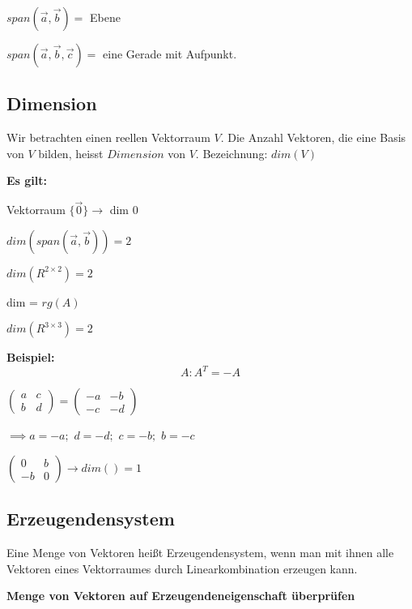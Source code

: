 \begin{multicols*}{3}
    {$span(\vec{a},\vec{b}) = $ Ebene}

    {$span(\vec{a},\vec{b},\vec{c}) = $ eine Gerade mit Aufpunkt.}


    \vfill\null
    \columnbreak
    \subsection{Dimension}
    { Wir betrachten einen reellen Vektorraum $V$.
        Die Anzahl Vektoren, die eine Basis von $V$ bilden, heisst $Dimension$ von $V$.
    }
    {Bezeichnung: $dim(V)$}

    {\textbf{Es gilt:} }
    \begin{multicols}{2}
        {Vektorraum $\{ \vec{0} \} \rightarrow $ dim $0$}

        {$dim(span(\vec{a},\vec{b})) = 2$}

        {$dim(R^{2 \times 2})=2$}
        \columnbreak

        {dim = $rg(A)$}

        {$dim(R^{3 \times 3})=2$}

    \end{multicols}
    {\textbf{Beispiel:} }
    $$A: A^T = -A$$

    $ \begin{pmatrix}
            a & c \\
            b & d
        \end{pmatrix} =
        \begin{pmatrix}
            -a & -b \\
            -c & -d
        \end{pmatrix}$

    $\implies a=-a;$ $d=-d;$ $c=-b;$ $b=-c$

    $        \begin{pmatrix}
            0  & b \\
            -b & 0
        \end{pmatrix} \to dim() = 1$



    \subsection{Erzeugendensystem}
    {Eine Menge von Vektoren heißt Erzeugendensystem, wenn man mit ihnen alle Vektoren eines Vektorraumes durch Linearkombination erzeugen kann.}

    {\textbf{Menge von Vektoren auf Erzeugendeneigenschaft überprüfen}}


\end{multicols*}
